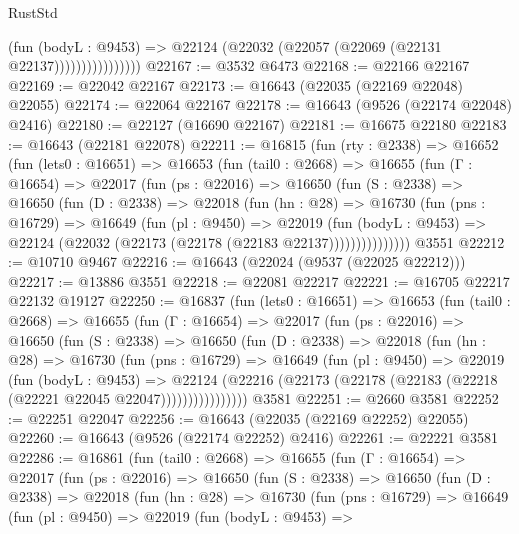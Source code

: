 \begin{lexlean}{RustStd}
\begin{coremodule}
                          (fun (bodyL : @9453) =>
                          @22124 (@22032 (@22057 (@22069 (@22131 @22137))))))))))))))))
@22167 := @3532 @6473
@22168 := @22166 @22167
@22169 := @22042 @22167
@22173 := @16643 (@22035 (@22169 @22048) @22055)
@22174 := @22064 @22167
@22178 := @16643 (@9526 (@22174 @22048) @2416)
@22180 := @22127 (@16690 @22167)
@22181 := @16675 @22180
@22183 := @16643 (@22181 @22078)
@22211 := @16815
    (fun (rty : @2338) =>
    @16652
      (fun (lets0 : @16651) =>
      @16653
        (fun (tail0 : @2668) =>
        @16655
          (fun (Γ : @16654) =>
          @22017
            (fun (ps : @22016) =>
            @16650
              (fun (S : @2338) =>
              @16650
                (fun (D : @2338) =>
                @22018
                  (fun (hn : @28) =>
                  @16730
                    (fun (pns : @16729) =>
                    @16649
                      (fun (pl : @9450) =>
                      @22019
                        (fun (bodyL : @9453) =>
                        @22124 (@22032 (@22173 (@22178 (@22183 @22137)))))))))))))))
    @3551
@22212 := @10710 @9467
@22216 := @16643 (@22024 (@9537 (@22025 @22212)))
@22217 := @13886 @3551
@22218 := @22081 @22217
@22221 := @16705 @22217 @22132 @19127
@22250 := @16837
    (fun (lets0 : @16651) =>
    @16653
      (fun (tail0 : @2668) =>
      @16655
        (fun (Γ : @16654) =>
        @22017
          (fun (ps : @22016) =>
          @16650
            (fun (S : @2338) =>
            @16650
              (fun (D : @2338) =>
              @22018
                (fun (hn : @28) =>
                @16730
                  (fun (pns : @16729) =>
                  @16649
                    (fun (pl : @9450) =>
                    @22019
                      (fun (bodyL : @9453) =>
                      @22124
                        (@22216
                          (@22173 (@22178 (@22183 (@22218 (@22221 @22045 @22047))))))))))))))))
    @3581
@22251 := @2660 @3581
@22252 := @22251 @22047
@22256 := @16643 (@22035 (@22169 @22252) @22055)
@22260 := @16643 (@9526 (@22174 @22252) @2416)
@22261 := @22221 @3581
@22286 := @16861
    (fun (tail0 : @2668) =>
    @16655
      (fun (Γ : @16654) =>
      @22017
        (fun (ps : @22016) =>
        @16650
          (fun (S : @2338) =>
          @16650
            (fun (D : @2338) =>
            @22018
              (fun (hn : @28) =>
              @16730
                (fun (pns : @16729) =>
                @16649
                  (fun (pl : @9450) =>
                  @22019
                    (fun (bodyL : @9453) =>

\end{coremodule}
\end{lexlean}
